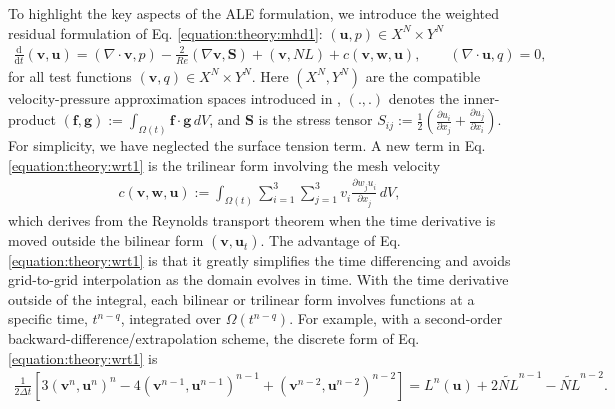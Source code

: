 \documentclass[letterpaper,10pt,english]{sphinxmanual}
\begin{document}
To highlight the key aspects of the ALE formulation, we introduce the weighted residual formulation
of Eq. \eqref{equation:theory:mhd1}:  \((\mathbf u,p) \in X^N \times Y^N\) 
\begin{equation}\label{equation:theory:wrt1}
\begin{split}\frac{\mathrm d}{\mathrm d t}(\mathbf v,\mathbf u) = (\nabla \cdot \mathbf v,p) - \frac{2}{Re}(\nabla \mathbf v,\mathbf S)
+(\mathbf v,N\!L) + c(\mathbf v,\mathbf w,\mathbf u),
\qquad
(\nabla \cdot \mathbf u,q) = 0,\end{split}
\end{equation}
for all test functions \((\mathbf v,q) \in X^N \times Y^N\).  Here \((X^N,Y^N)\) are the
compatible velocity-pressure approximation spaces introduced in \label{\detokenize{theory:id5}}{\hyperref[\detokenize{bibliography:maday1989}]{\sphinxcrossref{{[}Maday1989{]}}}}, \((.,.)\) denotes
the inner-product \((\mathbf f,\mathbf g) := \int_{\Omega(t)} \mathbf f \cdot \mathbf g \,dV\),
and \(\mathbf S\) is the stress tensor \(S_{ij}^{} := \frac{1}{2}( \frac{\partial
u_i}{\partial x_j} + \frac{\partial u_j}{\partial x_i} )\).  For simplicity, we have neglected the
surface tension term.  A new term in Eq.  \eqref{equation:theory:wrt1} is the trilinear form involving the mesh
velocity
\begin{equation}\label{equation:theory:trilin}
\begin{split}c(\mathbf v,\mathbf w,\mathbf u) :=
\int_{\Omega(t)}^{}
\sum_{i=1}^3
\sum_{j=1}^3 v_i^{} \frac{\partial w_j^{} u_i^{}}{\partial x_j^{}} \,dV,\end{split}
\end{equation}
which derives from the Reynolds transport theorem when the time derivative is moved outside the
bilinear form \((\mathbf v,\mathbf u_t^{})\).  The advantage of Eq. \eqref{equation:theory:wrt1} is that it
greatly simplifies the time differencing and avoids grid-to-grid interpolation as the domain
evolves in time.  With the time derivative outside of the integral, each bilinear or trilinear form
involves functions at a specific time, \(t^{n-q}\), integrated over \(\Omega(t^{n-q})\).
For example, with a second-order backward-difference/extrapolation scheme, the discrete form of
Eq. \eqref{equation:theory:wrt1} is
\begin{equation}\label{equation:theory:bdk}
\begin{split}\frac{1}{2 \Delta t}\left[
 3 (\mathbf v^n,\mathbf u^n)^n
-4 (\mathbf v^{n-1},\mathbf u^{n-1})^{n-1}
 + (\mathbf v^{n-2},\mathbf u^{n-2})^{n-2} \right]
= L^n (\mathbf u) +
2 \widetilde{N\!L}^{n-1}
- \widetilde{N\!L}^{n-2}.\end{split}
\end{equation}
\end{document}
